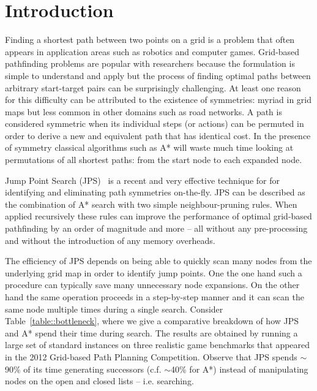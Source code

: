 \section{Introduction}
\label{sec::introduction}
Finding a shortest path between two points on a grid is a problem that often 
appears in application areas such as robotics and computer games. 
Grid-based
pathfinding problems are popular with researchers because the formulation is
simple to understand and apply but the process of finding optimal paths
between arbitrary start-target pairs can be surprisingly challenging. At least
one reason for this difficulty can be attributed to the existence of 
symmetries: myriad in grid maps but less common in other domains such as
road networks. A path is considered symmetric when its individual steps 
(or actions) can be permuted in order to derive a new and equivalent path
that has identical cost.
In the presence of symmetry classical algorithms such as A* will waste much 
time looking at permutations of all shortest paths: from the start node to each expanded node.

Jump Point Search (JPS)~\cite{harabor11b} is a recent and very effective 
technique for for identifying and eliminating path symmetries on-the-fly. 
JPS can be described as the combination of A* search with two simple 
neighbour-pruning rules. When applied recursively these rules
can improve the performance of optimal grid-based pathfinding by an order of 
magnitude and more -- all without any pre-processing and without the 
introduction of any memory overheads.



The efficiency of JPS depends on being able to quickly scan many nodes
from the underlying grid map in order to identify jump points.
One the one hand such a procedure can typically save many unnecessary
node expansions. On the other hand the same operation proceeds in a 
step-by-step manner and it can scan the same node multiple times during 
a single search. 
Consider Table~\ref{table::bottleneck}, where we give a comparative
breakdown of how JPS and A{*} spend their time during search.
The results are obtained by running
a large set of standard instances on three realistic game benchmarks
that appeared in the 2012 Grid-based Path Planning Competition. Observe that
JPS spends $\sim$90\% of its time generating successors (c.f. $\sim$40\% for
A{*}) instead of manipulating nodes on the open and closed lists -- i.e.
searching.

